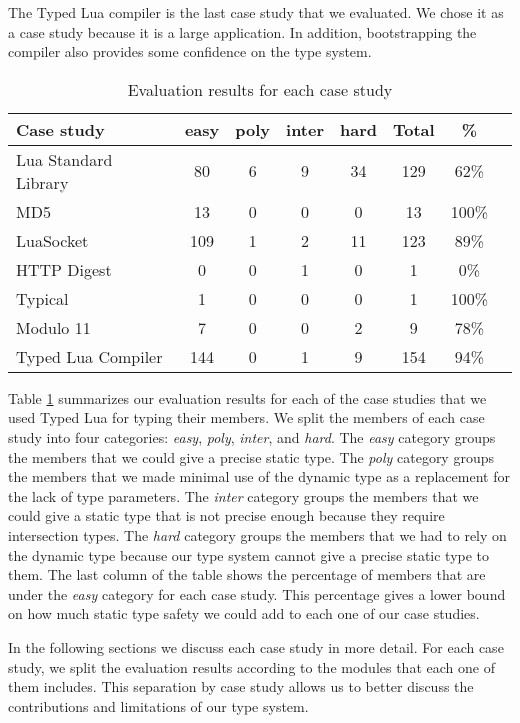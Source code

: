The Typed Lua compiler is the last case study that we evaluated.
We chose it as a case study because it is a large application.
In addition, bootstrapping the compiler also provides some
confidence on the type system.

\begin{table}[!ht]
\begin{center}
\begin{tabular}{|l|c|c|c|c|c|c|c|}
\hline
\textbf{Case study} & \textbf{easy} & \textbf{poly} & \textbf{inter} & \textbf{hard} & \textbf{Total} & \textbf{\%} \\
\hline
Lua Standard Library & 80 & 6 & 9 & 34 & 129 & 62\% \\
\hline
MD5 & 13 & 0 & 0 & 0 & 13 & 100\% \\
\hline
LuaSocket & 109 & 1 & 2 & 11 & 123 & 89\% \\
\hline
HTTP Digest & 0 & 0 & 1 & 0 & 1 & 0\% \\
\hline
Typical & 1 & 0 & 0 & 0 & 1 & 100\% \\
\hline
Modulo 11 & 7 & 0 & 0 & 2 & 9 & 78\% \\
\hline
Typed Lua Compiler & 144 & 0 & 1 & 9 & 154 & 94\% \\
\hline
\end{tabular}
\end{center}
\caption{Evaluation results for each case study}
\label{tab:evalbycase}
\end{table}

Table \ref{tab:evalbycase} summarizes our evaluation results for each
of the case studies that we used Typed Lua for typing their members.
We split the members of each case study into four categories:
\emph{easy}, \emph{poly}, \emph{inter}, and \emph{hard}.
The \emph{easy} category groups the members that we could give
a precise static type.
The \emph{poly} category groups the members that we made minimal
use of the dynamic type as a replacement for the lack of type parameters.
The \emph{inter} category groups the members that we could give
a static type that is not precise enough because they require
intersection types.
The \emph{hard} category groups the members that we had to rely
on the dynamic type because our type system cannot give a precise
static type to them.
The last column of the table shows the percentage of members that
are under the \emph{easy} category for each case study.
This percentage gives a lower bound on how much static type safety
we could add to each one of our case studies.

In the following sections we discuss each case study in more detail.
For each case study, we split the evaluation results according
to the modules that each one of them includes.
This separation by case study allows us to better discuss the
contributions and limitations of our type system.

